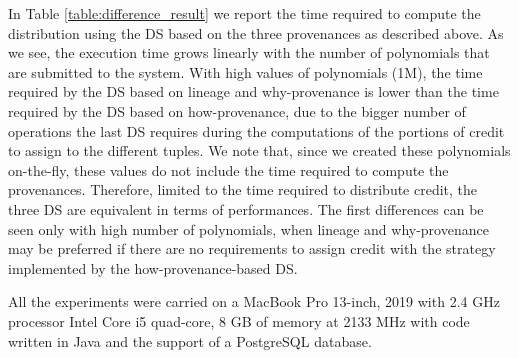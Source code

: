 In Table \ref{table:difference_result} we report the time required to compute the distribution using the DS based on the three provenances as described above. As we see, the execution time grows linearly with the number of polynomials that are submitted to the system. With high values of polynomials (1M), the time required by the DS based on lineage and why-provenance is lower than the time required by the DS based on how-provenance, due to the bigger number of operations the last DS requires during the computations of the portions of credit to assign to the different tuples. 
We note that, since we created these polynomials on-the-fly, these values do not include the time required to compute the provenances.
Therefore, limited to the time required to distribute credit, the three DS are equivalent in terms of performances. The first differences can be seen only with high number of polynomials, when lineage and why-provenance may be preferred if there are no requirements to assign credit with the strategy implemented by the how-provenance-based DS.

All the experiments were carried on a MacBook Pro 13-inch, 2019 with 2.4 GHz processor Intel Core i5 quad-core, 8 GB of memory at 2133 MHz with code written in Java and the support of a PostgreSQL database. 


%
%
%
% 
